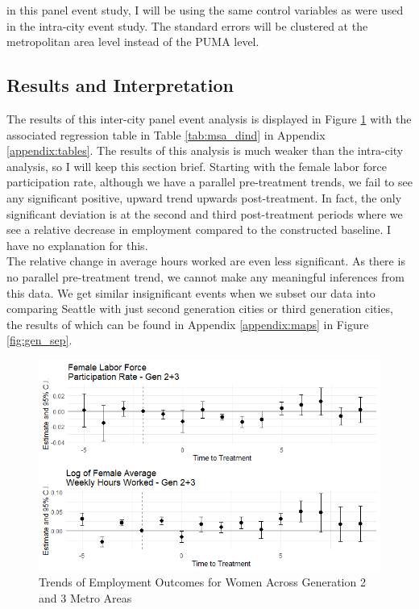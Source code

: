 \documentclass[A4paper,12pt]{article}
\begin{document}
in this panel event study, I will be using the same control variables as were used in the intra-city event study. The standard errors will be clustered at the metropolitan area level instead of the PUMA level.\\

\subsection{Results and Interpretation}

The results of this inter-city panel event analysis is displayed in Figure \ref{gen_all} with the associated regression table in Table \ref{tab:msa_dind} in Appendix \ref{appendix:tables}. The results of this analysis is much weaker than the intra-city analysis, so I will keep this section brief.  Starting with the female labor force participation rate, although we have a parallel pre-treatment trends, we fail to see any significant positive, upward trend upwards post-treatment. In fact, the only significant deviation is at the second and third post-treatment periods where we see a relative decrease in employment compared to the constructed baseline. I have no explanation for this. \\

The relative change in average hours worked are even less significant. As there is no parallel pre-treatment trend, we cannot make any meaningful inferences from this data. We get similar insignificant events when we subset our data into comparing Seattle with just second generation cities or third generation cities, the results of which can be found in Appendix \ref{appendix:maps} in Figure \ref{fig:gen_sep}. \\

\begin{figure}[hbt!]
\caption{Trends of Employment Outcomes for Women Across Generation 2 and 3 Metro Areas}
\label{gen_all}
\centering
\includegraphics[width=1\textwidth]{Graphs/emp_outcome_allgen.png}
\end{figure}
\end{document}
